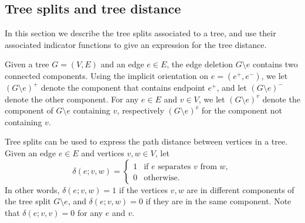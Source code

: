 \documentclass{amsart}
\theoremstyle{definition}
\begin{document}
\subsection{Tree splits and tree distance}
\label{sec:tree-splits}

In this section we describe the tree splits associated to a tree, and use their associated indicator functions to give an expression for the tree distance.

Given a tree $G = (V,E)$ and an edge $e \in E$, the edge deletion $G \setminus e$ contains two connected components.
Using the implicit orientation on $e = (e^+,e^-)$,
we let $(G \setminus e)^+$ denote the component that contains endpoint $e^+$, and let $(G\setminus e)^-$ denote the other component.
For any $e \in E$ and $v \in V$,
we let
$(G \setminus e)^{v}$ denote the component of $G\setminus e$ containing $v$,
respectively $(G\setminus e)^{\overline v}$ for the component not containing $v$.


Tree splits can be used to express the path distance between vertices in a tree.
Given an edge $e\in E$ and vertices $v,w \in V$, let 
\begin{equation}
\delta(e;v,w) = \begin{cases}
	1 &\text{if $e$ separates  $v$ from $w$}, \\
	0 &\text{otherwise}.
\end{cases}
\end{equation}
In other words, $\delta(e; v,w) = 1$ if the vertices $v, w$ are in different components of the tree split $G \setminus e$,
and $\delta(e; v,w) = 0$ if they are in the same component.
Note that $\delta(e; v,v) = 0$ for any $e$ and $v$.
\end{document}
